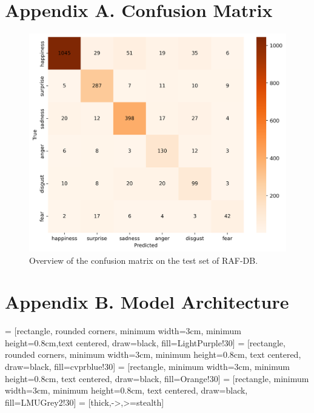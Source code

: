 \section*{Appendix A. Confusion Matrix}

\begin{figure}[ht]
  \centering
   \includegraphics[width=\linewidth]{mattest.png}
   \caption{Overview of the confusion matrix on the test set of RAF-DB.} 
   \label{fig:mattest}
\end{figure}

\newpage 

\section*{Appendix B. Model Architecture}

 = [rectangle, rounded corners, minimum width=3cm, minimum height=0.8cm,text centered, draw=black, fill=LightPurple!30]
 = [rectangle, rounded corners, minimum width=3cm, minimum height=0.8cm, text centered, draw=black, fill=cvprblue!30]
 = [rectangle, minimum width=3cm, minimum height=0.8cm, text centered, draw=black, fill=Orange!30]
 = [rectangle, minimum width=3cm, minimum height=0.8cm, text centered, draw=black, fill=LMUGrey2!30]
 = [thick,->,>=stealth]

